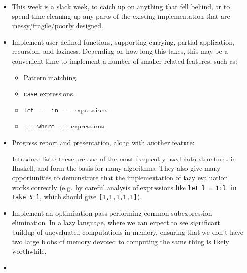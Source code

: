 \documentclass[12pt]{article}
\newcommand\haskell[1]{\texttt{#1}}
\begin{document}
\begin{itemize}
{    After this work is complete, the absolutely minimal success criteria should have been met, taking pressure off the
    rest of the planned work.
}
\item
{

    This week is a slack week, to catch up on anything that fell behind, or to spend time cleaning up any parts of the
    existing implementation that are messy/fragile/poorly designed.
}
\item
{

    Implement user-defined functions, supporting currying, partial application, recursion, and laziness. Depending on
    how long this takes, this may be a convenient time to implement a number of smaller related features, such as:
    
    \begin{itemize}
    \item Pattern matching.
    \item \haskell{case} expressions.
    \item \haskell{let ... in ...} expressions.
    \item \haskell{... where ...} expressions.
    \end{itemize}
}
\item
{

    Progress report and presentation, along with another feature:

    Introduce lists: these are one of the most frequently used data structures in Haskell, and form the basis for many
    algorithms. They also give many opportunities to demonstrate that the implementation of lazy evaluation works
    correctly (e.g.\ by careful analysis of expressions like \haskell{let l = 1:l in take 5 l}, which should give
    \haskell{[1,1,1,1,1]}).
}
\item
{

    Implement an optimisation pass performing common subexpression elimination. In a lazy language, where we can expect
    to see significant buildup of unevaluated computations in memory, ensuring that we don't have two large blobs of
    memory devoted to computing the same thing is likely worthwhile.

}
\item
{

}
\end{itemize}
\end{document}
